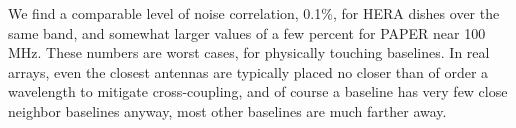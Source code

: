 We find a comparable level of noise correlation, 0.1\%, for HERA dishes over the same band, and somewhat larger values of a few percent for PAPER near 100\,MHz. These numbers are worst cases, for physically touching baselines. In real arrays, even the closest antennas are typically placed no closer than of order a wavelength to mitigate cross-coupling, and of course a baseline has very few close neighbor baselines anyway, most other baselines are much farther away. 


